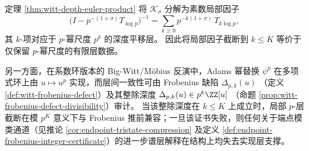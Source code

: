 \begin{remark}\label{rem:witt-depth-local-p-frobenius}
定理 \ref{thm:witt-depth-euler-product} 将 \(\mathcal{K}_{\sigma}\) 分解为素数局部因子
\[
\bigl(I-p^{-(1+\sigma)}T_{\log p}\bigr)^{-1}
=\sum_{k\ge 0}p^{-k(1+\sigma)}\,T_{k\log p},
\]
其 \(k\)-项对应于 \(p\)-幂尺度 \(p^{k}\) 的深度平移层。
因此将局部因子截断到 \(k\le K\) 等价于仅保留 \(p\)-幂尺度的有限层数据。
\par
另一方面，在系数环版本的 Big-Witt/Möbius 反演中，Adams 幂替换 \(\psi^{p}\) 在多项式环上由 \(u\mapsto u^{p}\) 实现，而层间一致性可由 Frobenius 缺陷
\(
\Delta_{p,k}(u)
\)
（定义 \ref{def:witt-frobenius-defect}）及其整除深度
\(
\Delta_{p,k}(u)\in p^{k}\ZZ[u]
\)
（命题 \ref{prop:witt-frobenius-defect-divisibility}）审计。
当该整除深度在 \(k\le K\) 上成立时，局部 \(p\)-层截断在模 \(p^{K}\) 意义下与 Frobenius 推前兼容；一旦该证书失败，则任何关于端点模类通道（见推论 \ref{cor:endpoint-tristate-compression} 及定义 \ref{def:endpoint-frobenius-integer-certificate}）的进一步谱层解释在结构上均失去实现层支撑。
\end{remark}
